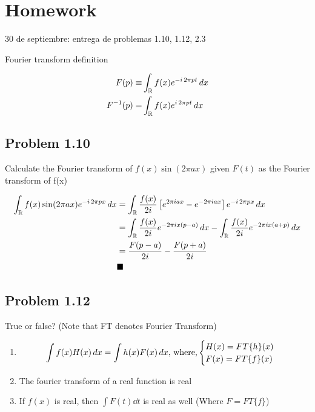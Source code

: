 \documentclass[../main/main.tex]{subfiles}
\begin{document}
\section{Homework}

30 de septiembre: entrega de problemas 1.10, 1.12, 2.3

Fourier transform definition

\begin{align}
	F(p)\equiv & \int_{\mathbb{R}}f(x)e^{-i\, 2\pi pt} \mathop{dx} \\
	F^{-1}(p)= & \int_{\mathbb{R}}f(x)e^{i\, 2\pi pt} \mathop{dx}
\end{align}

\subsection*{Problem 1.10}

Calculate the Fourier transform of $f(x) \sin (2\pi a x)$ given $F(t)$ as the Fourier transform of f(x)

\begin{align*}
	\fourierfull{ f(x) \sin (2\pi a x) e^{-i\, 2\pi px}} & =
	\fourierfull{\frac{f(x)}{2i} \left[e^{2\pi i ax}-e^{-2\pi i ax}\right] e^{-i\, 2\pi px}}                     \\
	                                                     & = 	\fourierfull{\frac{f(x)}{2i} e^{-2\pi i x (p-a)}} -
	\fourierfull{\frac{f(x)}{2i} e^{-2\pi i x(a+p)}}                                                             \\&=
	\frac{F(p-a)}{2i}  -
	\frac{F(p+a)}{2i}                                                                                            \\
	                                                     & \qed
\end{align*}

\subsection*{Problem 1.12}

True or false? (Note that FT denotes Fourier Transform)

\begin{enumerate}
	\item
	      \begin{equation*}
		      \int f(x)H(x)\mathop{dx} = \int h(x)F(x)\mathop{dx},\,\textrm{where,}
		      \begin{cases}
			      H(x) = FT\{h\}(x) \\
			      F(x) = FT\{f\}(x)
		      \end{cases}
	      \end{equation*}
	\item The fourier transform of a real function is real
	\item If $f(x)$ is real, then $\int F(t)\dd t$ is real as well (Where $F = FT\{f\}$)
\end{enumerate}
\end{document}
